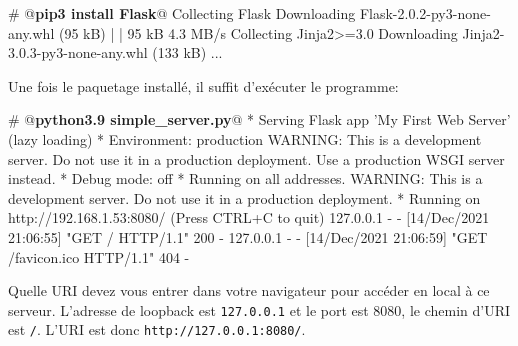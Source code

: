 \begin{termc}[backgroundcolor=\color{palerod}, language=json, basicstyle=\ttfamily\small, escapechar=@]
# @\textbf{pip3 install Flask}@
Collecting Flask
  Downloading Flask-2.0.2-py3-none-any.whl (95 kB)
     |                                  | 95 kB 4.3 MB/s 
Collecting Jinja2>=3.0
  Downloading Jinja2-3.0.3-py3-none-any.whl (133 kB)
...
\end{termc}

  \vspace{1em}

Une fois le paquetage installé, il suffit d'exécuter le programme:
\begin{termc}[backgroundcolor=\color{palerod}, language=json, basicstyle=\ttfamily\small, escapechar=@]
# @\textbf{python3.9 simple\_server.py}@
 * Serving Flask app 'My First Web Server' (lazy loading)
 * Environment: production
   WARNING: This is a development server. Do not use it in a production
   deployment.
   Use a production WSGI server instead.
 * Debug mode: off
 * Running on all addresses.
   WARNING: This is a development server. Do not use it in a production
   deployment.
 * Running on http://192.168.1.53:8080/ (Press CTRL+C to quit)
127.0.0.1 - - [14/Dec/2021 21:06:55] "GET / HTTP/1.1" 200 -
127.0.0.1 - - [14/Dec/2021 21:06:59] "GET /favicon.ico HTTP/1.1" 404 -
\end{termc}


{Quelle URI devez vous entrer dans votre navigateur pour accéder en local à ce serveur.}
{L'adresse de loopback est \texttt{127.0.0.1} et le port est 8080, le chemin d'URI est \texttt{/}. L'URI est donc \texttt{http://127.0.0.1:8080/}.}


